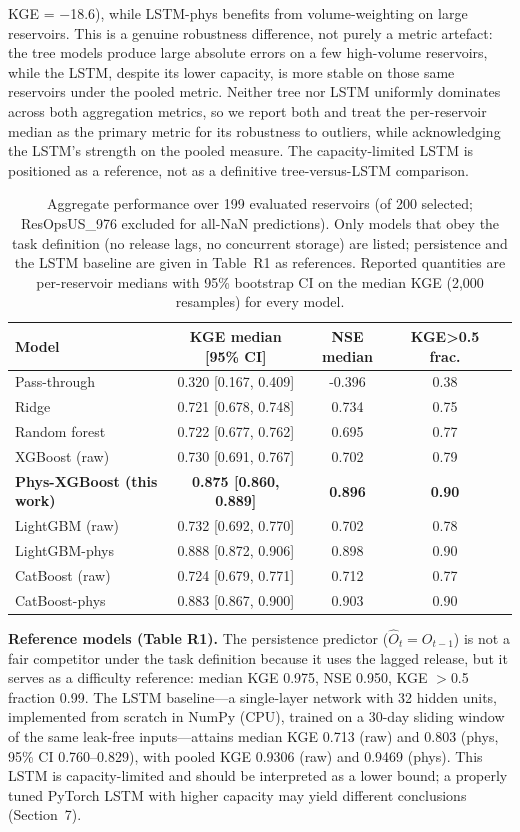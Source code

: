\documentclass[journal]{ascelike-new}
\begin{document}
KGE = $-$18.6), while LSTM-phys benefits from volume-weighting on large reservoirs. This is a genuine robustness difference, not purely a metric artefact: the tree models produce large absolute errors on a few high-volume reservoirs, while the LSTM, despite its lower capacity, is more stable on those same reservoirs under the pooled metric. Neither tree nor LSTM uniformly dominates across both aggregation metrics, so we report both and treat the per-reservoir median as the primary metric for its robustness to outliers, while acknowledging the LSTM's strength on the pooled measure. The capacity-limited LSTM is positioned as a reference, not as a definitive tree-versus-LSTM comparison.


\begin{table}[t]
  \centering
  \caption{Aggregate performance over 199 evaluated reservoirs (of 200 selected; ResOpsUS\_976 excluded for all-NaN predictions). Only models that obey the task definition (no release lags, no concurrent storage) are listed; persistence and the LSTM baseline are given in Table~R1 as references. Reported quantities are per-reservoir medians with 95\% bootstrap CI on the median KGE (2,000 resamples) for every model.}
  \begin{tabular}{lcccc}
    \toprule
    Model & KGE median [95\% CI] & NSE median & KGE>0.5 frac. \\
    \midrule
    Pass-through & 0.320 [0.167, 0.409] & -0.396 & 0.38 \\
    Ridge & 0.721 [0.678, 0.748] & 0.734 & 0.75 \\
    Random forest & 0.722 [0.677, 0.762] & 0.695 & 0.77 \\
    XGBoost (raw) & 0.730 [0.691, 0.767] & 0.702 & 0.79 \\
    \textbf{Phys-XGBoost (this work)} & \textbf{0.875 [0.860, 0.889]} & \textbf{0.896} & \textbf{0.90} \\
    LightGBM (raw) & 0.732 [0.692, 0.770] & 0.702 & 0.78 \\
    LightGBM-phys & 0.888 [0.872, 0.906] & 0.898 & 0.90 \\
    CatBoost (raw) & 0.724 [0.679, 0.771] & 0.712 & 0.77 \\
    CatBoost-phys & 0.883 [0.867, 0.900] & 0.903 & 0.90 \\
    \bottomrule
  \end{tabular}
\end{table}

\noindent\textbf{Reference models (Table R1).} The persistence predictor ($\hat O_t = O_{t-1}$) is not a fair competitor under the task definition because it uses the lagged release, but it serves as a difficulty reference: median KGE 0.975, NSE 0.950, KGE $>$0.5 fraction 0.99. The LSTM baseline---a single-layer network with 32 hidden units, implemented from scratch in NumPy (CPU), trained on a 30-day sliding window of the same leak-free inputs---attains median KGE 0.713 (raw) and 0.803 (phys, 95\% CI 0.760--0.829), with pooled KGE 0.9306 (raw) and 0.9469 (phys). This LSTM is capacity-limited and should be interpreted as a lower bound; a properly tuned PyTorch LSTM with higher capacity may yield different conclusions (Section~7).
\end{document}
